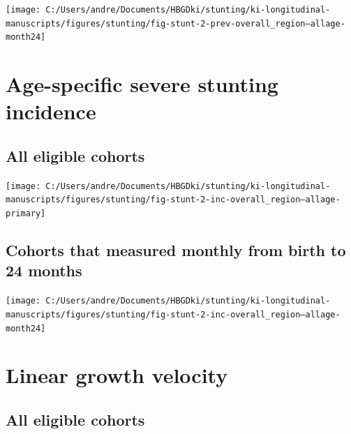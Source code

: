 \documentclass[
  9pt,
]{book}
\begin{document}
\texttt{[image: C:/Users/andre/Documents/HBGDki/stunting/ki-longitudinal-manuscripts/figures/stunting/fig-stunt-2-prev-overall\_region--allage-month24]}

\hypertarget{age-specific-severe-stunting-incidence-1}{%
\section{Age-specific severe stunting incidence}\label{age-specific-severe-stunting-incidence-1}}

\hypertarget{all-eligible-cohorts-2}{%
\subsection{All eligible cohorts}\label{all-eligible-cohorts-2}}

\texttt{[image: C:/Users/andre/Documents/HBGDki/stunting/ki-longitudinal-manuscripts/figures/stunting/fig-stunt-2-inc-overall\_region--allage-primary]}

\hypertarget{cohorts-that-measured-monthly-from-birth-to-24-months-2}{%
\subsection{Cohorts that measured monthly from birth to 24 months}\label{cohorts-that-measured-monthly-from-birth-to-24-months-2}}

\texttt{[image: C:/Users/andre/Documents/HBGDki/stunting/ki-longitudinal-manuscripts/figures/stunting/fig-stunt-2-inc-overall\_region--allage-month24]}

\hypertarget{linear-growth-velocity}{%
\section{Linear growth velocity}\label{linear-growth-velocity}}

\hypertarget{all-eligible-cohorts-3}{%
\subsection{All eligible cohorts}\label{all-eligible-cohorts-3}}
\end{document}
